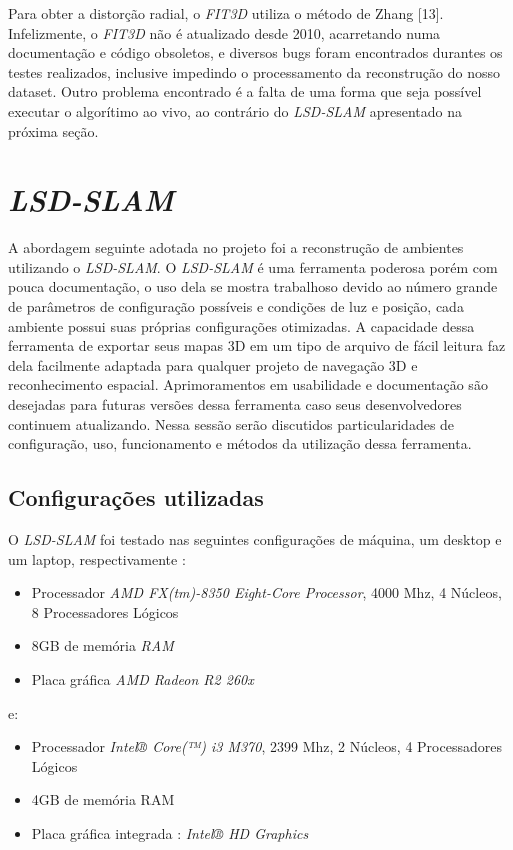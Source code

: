 Para obter a distorção radial, o \textit{FIT3D} utiliza o método de Zhang [13]. Infelizmente, o \textit{FIT3D} não é atualizado desde 2010, acarretando numa documentação e código obsoletos, e diversos bugs foram encontrados durantes os testes realizados, inclusive impedindo o processamento da reconstrução do nosso dataset. Outro problema encontrado é a falta de uma forma que seja possível executar o algorítimo ao vivo, ao contrário do \textit{LSD-SLAM} apresentado na próxima seção.


\section{\textit{LSD-SLAM}}

A abordagem seguinte adotada no projeto foi a reconstrução de ambientes utilizando o \textit{LSD-SLAM}. O \textit{LSD-SLAM} é uma ferramenta poderosa porém com pouca documentação, o uso dela se mostra trabalhoso devido ao número grande de parâmetros de configuração possíveis e condições de luz e posição, cada ambiente possui suas próprias configurações otimizadas. A capacidade dessa ferramenta de exportar seus mapas 3D em um tipo de arquivo de fácil leitura faz dela facilmente adaptada para qualquer projeto de navegação 3D e reconhecimento espacial. Aprimoramentos em usabilidade e documentação são desejadas para futuras versões dessa ferramenta caso seus desenvolvedores continuem atualizando. Nessa sessão serão discutidos particularidades de configuração, uso, funcionamento e métodos da utilização dessa ferramenta.

\subsection{Configurações utilizadas}

O \textit{LSD-SLAM} foi testado nas seguintes configurações de máquina, um desktop e um laptop, respectivamente :

\begin{itemize}
	\item{Processador	\textit{AMD FX(tm)-8350 Eight-Core Processor}, 4000 Mhz, 4 Núcleos, 8 Processadores Lógicos}
	\item{8GB de memória \textit{RAM}}
	\item{Placa gráfica \textit{AMD Radeon R2 260x}}
\end{itemize}

e:

\begin{itemize}
	\item{Processador \textit{Intel® Core(™) i3 M370}, 2399 Mhz, 2 Núcleos, 4 Processadores Lógicos}
	\item{4GB de memória RAM}
	\item{Placa gráfica integrada : \textit{Intel® HD Graphics}}
\end{itemize}	

